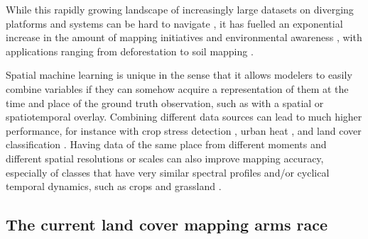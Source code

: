         While this rapidly growing landscape of increasingly large datasets on diverging platforms and systems can be hard to navigate \citep{wagemann2021a}, it has fuelled an exponential increase in the amount of mapping initiatives and environmental awareness \citep{wulder2022fifty}, with applications ranging from deforestation \citep{hansen2013high} to soil mapping \citep{hengl2017soilgrids250m}.
        
        Spatial machine learning is unique in the sense that it allows modelers to easily combine variables if they can somehow acquire a representation of them at the time and place of the ground truth observation, such as with a spatial or spatiotemporal overlay. Combining different data sources can lead to much higher performance, for instance with crop stress detection  \citep{berger2022multi}, urban heat \citep{shahi2015novel}, and land cover classification \citep{zhu2016optimizing, hurskainen2019auxiliary, hosseiny2022urban,xu20183d}. Having data of the same place from different moments \citep{low2013impact} and different spatial resolutions or scales \citep{santos2012multiscale} can also improve mapping accuracy, especially of classes that have very similar spectral profiles and/or cyclical temporal dynamics, such as crops and grassland \citep{esch2014differentiation}.

\subsection*{The current land cover mapping arms race}
        
